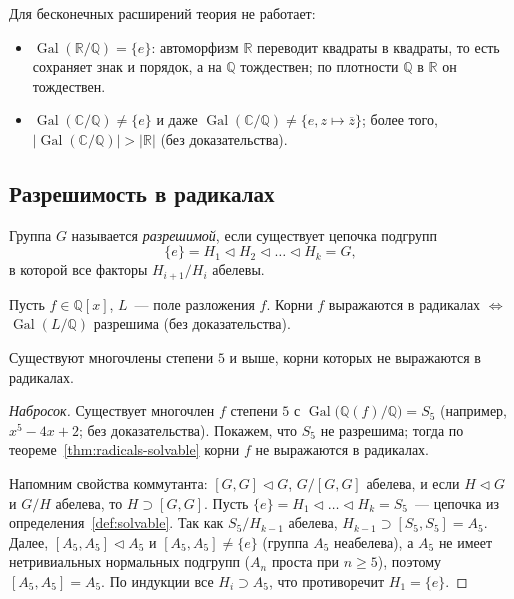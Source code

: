 \documentclass[12pt]{article}
\begin{document}
	\begin{example}
		Для бесконечных расширений теория не работает:
		\begin{itemize}
			\item $\operatorname{Gal}(\mathbb{R}/\mathbb{Q}) = \{ e \}$: автоморфизм $\mathbb{R}$ переводит квадраты в квадраты, то есть сохраняет знак и порядок, а на $\mathbb{Q}$ тождествен; по плотности $\mathbb{Q}$ в $\mathbb{R}$ он тождествен.
			\item $\operatorname{Gal}(\mathbb{C}/\mathbb{Q}) \ne \{ e \}$ и даже $\operatorname{Gal}(\mathbb{C}/\mathbb{Q}) \ne \{ e, z \mapsto \overline{z} \}$; более того, $|\operatorname{Gal}(\mathbb{C}/\mathbb{Q})| > |\mathbb{R}|$ (без доказательства).
		\end{itemize}
	\end{example}

	\subsection{Разрешимость в радикалах}

	\begin{definition}\label{def:solvable}
		Группа $G$ называется \emph{разрешимой}, если существует цепочка подгрупп
		\[
			\{ e \} = H_1 \vartriangleleft H_2 \vartriangleleft \ldots \vartriangleleft H_k = G,
		\]
		в которой все факторы $H_{i+1}/H_i$ абелевы.
	\end{definition}

	\begin{theorem}\label{thm:radicals-solvable}
		Пусть $f \in \mathbb{Q}[x]$, $L$~--- поле разложения $f$. Корни $f$ выражаются в радикалах $\Leftrightarrow$ $\operatorname{Gal}(L/\mathbb{Q})$ разрешима (без доказательства).
	\end{theorem}

	\begin{theorem}
		Существуют многочлены степени $5$ и выше, корни которых не выражаются в радикалах.
	\end{theorem}
	\begin{proof}[Набросок]
		Существует многочлен $f$ степени $5$ с $\operatorname{Gal}\bigl(\mathbb{Q}(f)/\mathbb{Q}\bigr) = S_5$ (например, $x^5 - 4x + 2$; без доказательства). Покажем, что $S_5$ не разрешима; тогда по теореме~\ref{thm:radicals-solvable} корни $f$ не выражаются в радикалах.

		Напомним свойства коммутанта: $[G, G] \vartriangleleft G$, $G/[G, G]$ абелева, и если $H \vartriangleleft G$ и $G/H$ абелева, то $H \supset [G, G]$. Пусть $\{e\} = H_1 \vartriangleleft \ldots \vartriangleleft H_k = S_5$~--- цепочка из определения~\ref{def:solvable}. Так как $S_5/H_{k-1}$ абелева, $H_{k-1} \supset [S_5, S_5] = A_5$. Далее, $[A_5, A_5] \vartriangleleft A_5$ и $[A_5, A_5] \ne \{e\}$ (группа $A_5$ неабелева), а $A_5$ не имеет нетривиальных нормальных подгрупп ($A_n$ проста при $n \geqslant 5$), поэтому $[A_5, A_5] = A_5$. По индукции все $H_i \supset A_5$, что противоречит $H_1 = \{e\}$.
	\end{proof}
\end{document}
